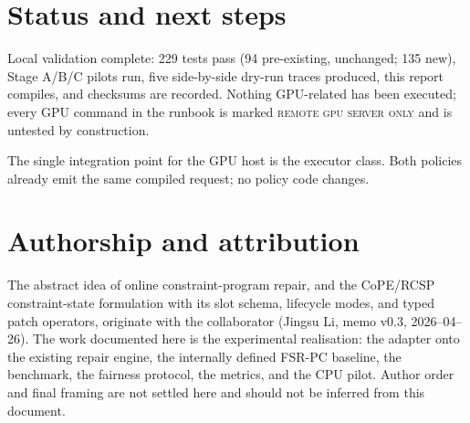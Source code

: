 \documentclass[11pt]{article}
\newcommand{\fsrpc}{\textsc{FSR-PC}}
\begin{document}
\section{Status and next steps}

Local validation complete: 229 tests pass (94 pre-existing, unchanged; 135 new),
Stage A/B/C pilots run, five side-by-side dry-run traces produced, this report
compiles, and checksums are recorded. Nothing GPU-related has been executed;
every GPU command in the runbook is marked \textsc{remote gpu server only} and
is untested by construction.

The single integration point for the GPU host is the executor class. Both
policies already emit the same compiled request; no policy code changes.

\section*{Authorship and attribution}

The abstract idea of online constraint-program repair, and the CoPE/RCSP
constraint-state formulation with its slot schema, lifecycle modes, and typed
patch operators, originate with the collaborator (Jingsu Li, memo v0.3,
2026--04--26). The work documented here is the experimental realisation: the
adapter onto the existing repair engine, the internally defined \fsrpc{}
baseline, the benchmark, the fairness protocol, the metrics, and the CPU pilot.
Author order and final framing are not settled here and should not be inferred
from this document.
\end{document}
